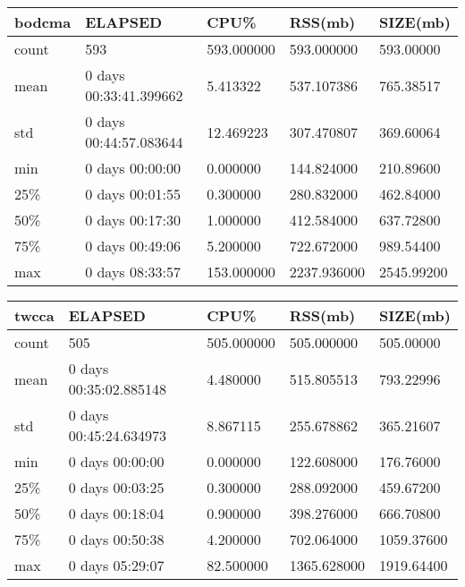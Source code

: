 \documentclass{article}
\begin{document}
\begin{tabular}{|l|l|l|l|l|}
\hline 
\hline bodcma& ELAPSED&   CPU\%&  RSS(mb)&   SIZE(mb) \\
\hline count&    593& 593.000000&  593.000000&  593.00000 \\
\hline mean&  0 days 00:33:41.399662&  5.413322&  537.107386&  765.38517 \\
\hline std&  0 days 00:44:57.083644&  12.469223&  307.470807&  369.60064 \\
\hline min&   0 days 00:00:00&  0.000000&  144.824000&  210.89600 \\
\hline 25\%&   0 days 00:01:55&  0.300000&  280.832000&  462.84000 \\
\hline 50\%&   0 days 00:17:30&  1.000000&  412.584000&  637.72800 \\
\hline 75\%&   0 days 00:49:06&  5.200000&  722.672000&  989.54400 \\
\hline max&   0 days 08:33:57& 153.000000& 2237.936000& 2545.99200 \\
\hline 
\end{tabular}
 
\begin{tabular}{|l|l|l|l|l|}
\hline 
\hline twcca& ELAPSED&   CPU\%&  RSS(mb)&   SIZE(mb) \\
\hline count&    505& 505.000000&  505.000000&  505.00000 \\
\hline mean&  0 days 00:35:02.885148&  4.480000&  515.805513&  793.22996 \\
\hline std&  0 days 00:45:24.634973&  8.867115&  255.678862&  365.21607 \\
\hline min&   0 days 00:00:00&  0.000000&  122.608000&  176.76000 \\
\hline 25\%&   0 days 00:03:25&  0.300000&  288.092000&  459.67200 \\
\hline 50\%&   0 days 00:18:04&  0.900000&  398.276000&  666.70800 \\
\hline 75\%&   0 days 00:50:38&  4.200000&  702.064000& 1059.37600 \\
\hline max&   0 days 05:29:07&  82.500000& 1365.628000& 1919.64400 \\
\hline 
\end{tabular}
 
\end{document}
